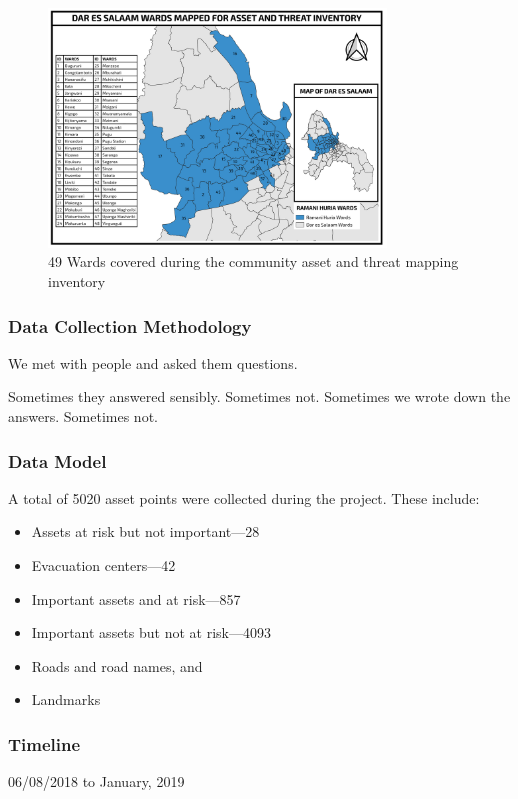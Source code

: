 \documentclass[a4paper,12pt,twoside]{article}
\begin{document}
\begin{figure}[h]
  \color{RHgreen}\caption{49 Wards covered during the community asset and threat mapping inventory}
  \centering
  \includegraphics[width=0.8\textwidth]{images/asset_and_threat_wards.png}
\end{figure}

\subsubsection{Data Collection Methodology}

We met with people and asked them questions.

Sometimes they answered sensibly. Sometimes not. Sometimes we wrote down the answers. Sometimes not.

\subsubsection{Data Model}

A total of 5020 asset points were collected during the project. These include:
\begin{itemize}
    \item Assets at risk but not important---28 
    \item Evacuation centers---42
    \item Important assets and at risk---857
    \item Important assets but not at risk---4093
    \item Roads and road names, and
    \item Landmarks
\end{itemize}

\subsubsection{Timeline}
06/08/2018 to January, 2019
\end{document}
